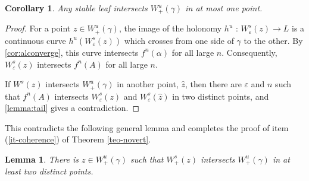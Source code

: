 \documentclass[11pt]{amsart} %
\newcommand{\Ws}{W^s}
\newcommand{\Wup}{W^u_+}
\newcommand{\Wsp}{W^s_+}
\newcommand{\gam}{\gamma}
\newcommand{\eps}{\varepsilon}
\numberwithin{equation}{section}
\newtheorem{cor}[equation]{Corollary}
\newtheorem{lemma}[equation]{Lemma}
\theoremstyle{remark}
\begin{document}
\begin{cor}
    Any stable leaf intersects $\Wup(\gamma)$
    in at most one point.
\end{cor}
\begin{proof}
    For a point $z  \in  \Wup(\gamma)$,
    the image of the holonomy $h^u$ : $\Ws_\eps(z)  \to  L$
    is a continuous curve $h^u(\Ws_\eps(z))$
    which crosses from one side of $\gam$ to the other.
    By \cref{cor:alconverge}, this curve intersects $f^n(\alpha)$ for all large $n$.
    Consequently, $\Ws_\eps(z)$ intersects $f^n(A)$ for all large $n$.

    If $\Ws(z)$ intersects $\Wup(\gamma)$ in another point, $\hat z$,
    then there are $\eps$ and $n$ such that $f^n(A)$ intersects
    $\Ws_\eps(z)$ and $\Ws_\eps(\hat z)$ in two distinct points,
    and \cref{lemma:tail} gives
    a contradiction.
\end{proof}


%
%
%
%
%
%
%
%
%
%
%
%
%
%
%
%
%
%
%
%
%
%
%
%
%
%
%
%
%
%
%
%
%
%
%
%
%
%
%
%
%
%
%
%
%
%
%
%
%
%
%
%
%
%
%

 This  contradicts the following general lemma and completes the proof of item (\ref{it-coherence}) of Theorem \ref{teo-novert}.

\begin{lemma}\label{lem-twopoints} 
%
   There is  $z \in \Wup(\gamma)$ such that $\Wsp(z)$ intersects $\Wup(\gamma)$
    in at least two distinct points.
\end{lemma}
%
%
%
\end{document}
